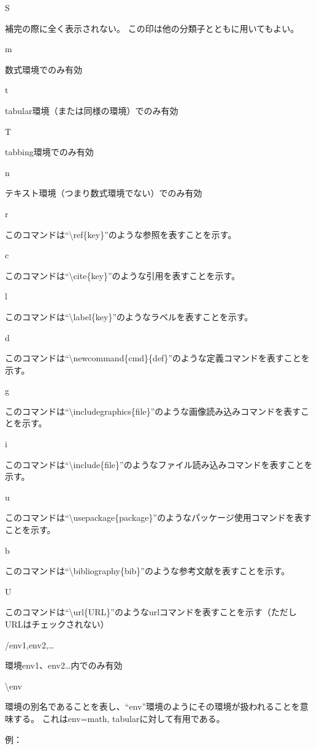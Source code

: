 \documentclass[]{book}
\begin{document}
S

補完の際に全く表示されない。 この印は他の分類子とともに用いてもよい。

m

数式環境でのみ有効

t

tabular環境（または同様の環境）でのみ有効

T

tabbing環境でのみ有効

n

テキスト環境（つまり数式環境でない）でのみ有効

r

このコマンドは``\textbackslash{}ref\{key\}''のような参照を表すことを示す。

c

このコマンドは``\textbackslash{}cite\{key\}''のような引用を表すことを示す。

l

このコマンドは``\textbackslash{}label\{key\}''のようなラベルを表すことを示す。

d

このコマンドは``\textbackslash{}newcommand\{cmd\}\{def\}''のような定義コマンドを表すことを示す。

g

このコマンドは``\textbackslash{}includegraphics\{file\}''のような画像読み込みコマンドを表すことを示す。

i

このコマンドは``\textbackslash{}include\{file\}''のようなファイル読み込みコマンドを表すことを示す。

u

このコマンドは``\textbackslash{}usepackage\{package\}''のようなパッケージ使用コマンドを表すことを示す。

b

このコマンドは``\textbackslash{}bibliography\{bib\}''のような参考文献を表すことを示す。

U

このコマンドは``\textbackslash{}url\{URL\}''のようなurlコマンドを表すことを示す（ただしURLはチェックされない）

/env1,env2,\ldots{}

環境env1、env2\ldots{}内でのみ有効

\textbackslash{}env

環境の別名であることを表し、``env''環境のようにその環境が扱われることを意味する。
これはenv=math, tabularに対して有用である。

例：\\
\end{document}
